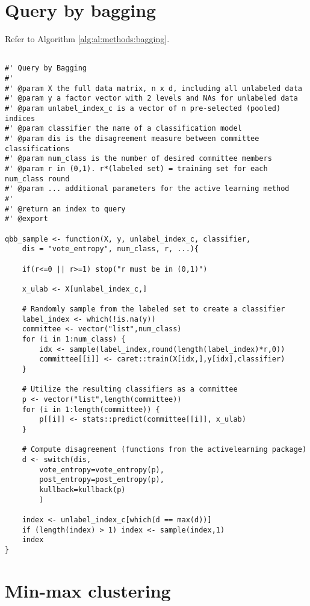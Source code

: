 \section{Query by bagging}
\label{sec:appendicies:al:bagging}

Refer to Algorithm \ref{alg:al:methods:bagging}. 
{
\begin{lstlisting}

#' Query by Bagging
#'
#' @param X the full data matrix, n x d, including all unlabeled data
#' @param y a factor vector with 2 levels and NAs for unlabeled data
#' @param unlabel_index_c is a vector of n pre-selected (pooled) indices
#' @param classifier the name of a classification model
#' @param dis is the disagreement measure between committee classifications
#' @param num_class is the number of desired committee members
#' @param r in (0,1). r*(labeled set) = training set for each num_class round
#' @param ... additional parameters for the active learning method
#'
#' @return an index to query
#' @export

qbb_sample <- function(X, y, unlabel_index_c, classifier, 
	dis = "vote_entropy", num_class, r, ...){

	if(r<=0 || r>=1) stop("r must be in (0,1)")
	
	x_ulab <- X[unlabel_index_c,]
	
	# Randomly sample from the labeled set to create a classifier
	label_index <- which(!is.na(y))
	committee <- vector("list",num_class)
	for (i in 1:num_class) {
		idx <- sample(label_index,round(length(label_index)*r,0))
		committee[[i]] <- caret::train(X[idx,],y[idx],classifier)
	}
	
	# Utilize the resulting classifiers as a committee
	p <- vector("list",length(committee))
	for (i in 1:length(committee)) {
		p[[i]] <- stats::predict(committee[[i]], x_ulab)
	}
	
	# Compute disagreement (functions from the activelearning package)
	d <- switch(dis,
		vote_entropy=vote_entropy(p),
		post_entropy=post_entropy(p),
		kullback=kullback(p)
		)
	
	index <- unlabel_index_c[which(d == max(d))]
	if (length(index) > 1) index <- sample(index,1)
	index
}
\end{lstlisting}
}

\section{Min-max clustering}
\label{sec:appendicies:al:clustering}


